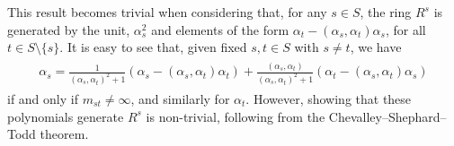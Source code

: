 \noindent\begin{remark} This result becomes trivial when considering that, for any $s \in S$, the ring $R^s$ is generated by the unit, $\alpha_s^2$ and elements of the form $\alpha_t - (\alpha_s, \alpha_t)\alpha_s$, for all $t \in S\setminus\{s\}$. It is easy to see that, given fixed $s, t \in S$ with $s \neq t$, we have
\begin{align*}
\begin{split}
\alpha_s = \frac{1}{(\alpha_s, \alpha_t)^2 + 1}(\alpha_s - (\alpha_s, \alpha_t)\alpha_t) + \frac{(\alpha_s, \alpha_t)}{(\alpha_s, \alpha_t)^2 + 1}(\alpha_t - (\alpha_s, \alpha_t)\alpha_s)
\end{split}
\end{align*}
\noindent if and only if $m_{st} \neq \infty$, and similarly for $\alpha_t$. However, showing that these polynomials generate $R^s$ is non-trivial, following from the Chevalley--Shephard--Todd theorem.\\%
\end{remark}

